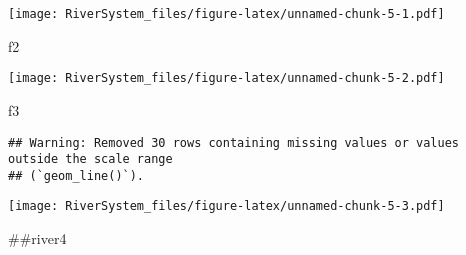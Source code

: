 \documentclass[
]{article}
\newenvironment{Shaded}{\begin{snugshade}}{\end{snugshade}}
\newcommand{\NormalTok}[1]{#1}
\begin{document}
\texttt{[image: RiverSystem\_files/figure-latex/unnamed-chunk-5-1.pdf]}

\begin{Shaded}
\begin{Highlighting}[]
\NormalTok{f2}
\end{Highlighting}
\end{Shaded}

\texttt{[image: RiverSystem\_files/figure-latex/unnamed-chunk-5-2.pdf]}

\begin{Shaded}
\begin{Highlighting}[]
\NormalTok{f3}
\end{Highlighting}
\end{Shaded}

\begin{verbatim}
## Warning: Removed 30 rows containing missing values or values outside the scale range
## (`geom_line()`).
\end{verbatim}

\texttt{[image: RiverSystem\_files/figure-latex/unnamed-chunk-5-3.pdf]}

\#\#river4
\end{document}
